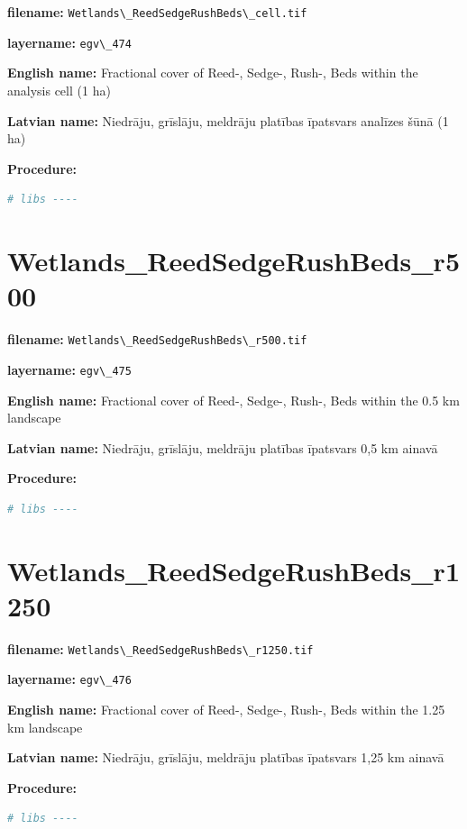 \documentclass[
]{book}
\newcommand{\passthrough}[1]{#1}
\begin{document}
\textbf{filename:} \passthrough{\lstinline!Wetlands\_ReedSedgeRushBeds\_cell.tif!}

\textbf{layername:} \passthrough{\lstinline!egv\_474!}

\textbf{English name:} Fractional cover of Reed-, Sedge-, Rush-, Beds within the analysis cell (1 ha)

\textbf{Latvian name:} Niedrāju, grīslāju, meldrāju platības īpatsvars analīzes šūnā (1 ha)

\textbf{Procedure:}

\begin{lstlisting}[language=R]
# libs ----
\end{lstlisting}

\section{Wetlands\_ReedSedgeRushBeds\_r500}\label{ch06.475}

\textbf{filename:} \passthrough{\lstinline!Wetlands\_ReedSedgeRushBeds\_r500.tif!}

\textbf{layername:} \passthrough{\lstinline!egv\_475!}

\textbf{English name:} Fractional cover of Reed-, Sedge-, Rush-, Beds within the 0.5 km landscape

\textbf{Latvian name:} Niedrāju, grīslāju, meldrāju platības īpatsvars 0,5 km ainavā

\textbf{Procedure:}

\begin{lstlisting}[language=R]
# libs ----
\end{lstlisting}

\section{Wetlands\_ReedSedgeRushBeds\_r1250}\label{ch06.476}

\textbf{filename:} \passthrough{\lstinline!Wetlands\_ReedSedgeRushBeds\_r1250.tif!}

\textbf{layername:} \passthrough{\lstinline!egv\_476!}

\textbf{English name:} Fractional cover of Reed-, Sedge-, Rush-, Beds within the 1.25 km landscape

\textbf{Latvian name:} Niedrāju, grīslāju, meldrāju platības īpatsvars 1,25 km ainavā

\textbf{Procedure:}

\begin{lstlisting}[language=R]
# libs ----
\end{lstlisting}
\end{document}
